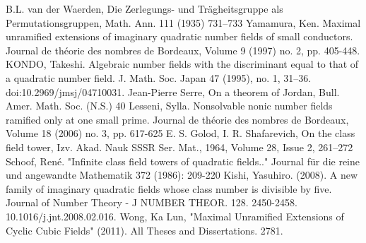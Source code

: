 \documentclass[preprint,12pt,reqno]{elsarticle}
\begin{document}
\begin{thebibliography}{9}
 B.L. van der Waerden, Die Zerlegungs- und Trägheitsgruppe als Permutationsgruppen, Math. Ann. 111 (1935) 731–733
 Yamamura, Ken. Maximal unramified extensions of imaginary quadratic number fields of small conductors. Journal de théorie des nombres de Bordeaux, Volume 9 (1997) no. 2, pp. 405-448.
 KONDO, Takeshi. Algebraic number fields with the discriminant equal to that of a quadratic number field. J. Math. Soc. Japan 47 (1995), no. 1, 31--36. doi:10.2969/jmsj/04710031.
 Jean-Pierre Serre, On a theorem of Jordan, Bull. Amer. Math. Soc. (N.S.) 40 
 Lesseni, Sylla. Nonsolvable nonic number fields ramified only at one small prime. Journal de théorie des nombres de Bordeaux, Volume 18 (2006) no. 3, pp. 617-625
E. S. Golod, I. R. Shafarevich, On the class field tower, Izv.
Akad. Nauk SSSR Ser. Mat., 1964, Volume 28, Issue 2, 261–272
Schoof, René. "Infinite class field towers of quadratic fields.." Journal für die reine und angewandte Mathematik 372 (1986): 209-220
Kishi, Yasuhiro. (2008). A new family of imaginary quadratic fields whose class number is divisible by five. Journal of Number Theory - J NUMBER THEOR. 128. 2450-2458. 10.1016/j.jnt.2008.02.016. 
Wong, Ka Lun, "Maximal Unramified Extensions of Cyclic Cubic Fields" (2011). All Theses and Dissertations. 2781. 
\end{thebibliography}
\end{document}
